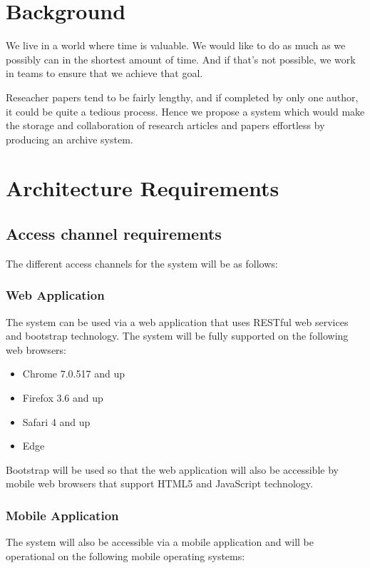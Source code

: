 \documentclass[11pt]{article}
\begin{document}
	\section{Background}
	
	We live in a world where time is valuable. We would like to do as much as we possibly can in the shortest amount of time. And if that's not possible, we work in teams to ensure that we achieve that goal.
	
	Reseacher papers tend to be fairly lengthy, and if completed by only one author, it could be quite a tedious process. Hence we propose a system which would make the storage and collaboration of research articles and papers effortless by producing an archive system.
	
	\newpage
	
	\section{Architecture Requirements}
	
	\subsection{Access channel requirements}
	The different access channels for the system will be as follows:
	
	\subsubsection{Web Application}
	The system can be used via a web application that uses RESTful web services and bootstrap technology. The system will be fully supported on the following web browsers:
	
	\begin{itemize}
		\item Chrome 7.0.517 and up
		\item Firefox 3.6 and up
		\item Safari 4 and up
		\item Edge
	\end{itemize}
	
	Bootstrap will be used so that the web application will also be accessible by mobile web browsers that support HTML5 and JavaScript technology.
	
	\subsubsection{Mobile Application}
	The system will also be accessible via a mobile application and will be operational on the following mobile operating systems:
	
\end{document}
